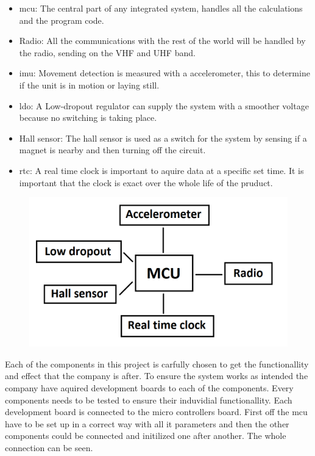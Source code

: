 \begin{itemize}[noitemsep] 
\item \gls{mcu}: The central part of any integrated system, handles all the calculations and the program code.
\item Radio: All the communications with the rest of the world will be handled by the radio, sending on the VHF and UHF band.
\item \gls{imu}: Movement detection is measured with a accelerometer, this to determine if the unit is  in motion or laying still. 
\item \gls{ldo}: A Low-dropout regulator can supply the system with a smoother voltage because no switching is taking place.
\item Hall sensor: The hall sensor is used as a switch for the system by sensing if a magnet is nearby and then turning off the circuit.
\item \gls{rtc}: A real time clock is important to aquire data at a specific set time. It is important that the clock is exact over the whole life of the pruduct.
\end{itemize} 


\begin{figure}[H] 
\centering 
\includegraphics[width=.8\linewidth]{Figures/System_diagram} 
\label{fig:sys_dia} 
\end{figure} 

Each of the components in this project is carfully chosen to get the functionallity and effect that the company is after. To ensure the system works as intended the company have aquired development boards to each of the components. Every components needs to be tested to ensure their induvidial functionallity. Each development board is connected to the micro controllers board. First off the \gls{mcu} have to be set up in a correct way with all it parameters and then the other components could be connected and initilized one after another. The whole connection can be seen. %

